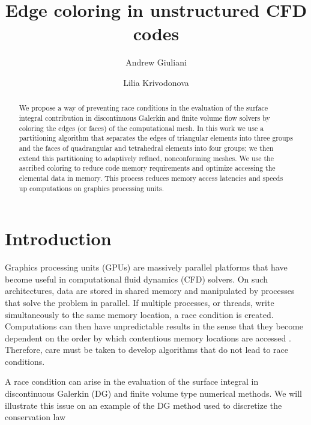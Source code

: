 \documentclass[12pt]{article}
\title{Edge coloring in unstructured CFD codes}
\author{Andrew Giuliani \and Lilia Krivodonova}
\begin{document}
	\date{\vspace{-5ex}}
	\maketitle


\begin{abstract}
	We propose a way of preventing race conditions in the evaluation of the surface integral contribution in discontinuous Galerkin and finite volume flow solvers by coloring the edges (or faces) of the computational mesh.  In this work we use a partitioning algorithm that separates the edges of triangular elements into three groups and the faces of quadrangular and tetrahedral elements into four groups; we then extend this partitioning to adaptively refined, nonconforming meshes.  We use the ascribed coloring to reduce code memory requirements and optimize accessing the elemental data in memory.  This process reduces memory access latencies and speeds up computations on graphics processing units.
\end{abstract}


\maketitle


\vspace{-6pt}

\section{Introduction} \label{sec:intro}

Graphics processing units (GPUs) are massively parallel platforms that have become useful in computational fluid dynamics (CFD) solvers.  On such architectures, data are stored in shared memory and manipulated by processes that solve the problem in parallel.  If multiple processes, or threads, write simultaneously to the same memory location, a race condition is created.  Computations can then have unpredictable results in the sense that they become dependent on the order by which contentious memory locations are accessed \cite{nvidiablog}.  Therefore, care must be taken to develop algorithms that do not lead to race conditions.




A race condition can arise in the evaluation of the surface integral in discontinuous Galerkin (DG) and finite volume type numerical methods.  We will illustrate this issue on an example of the DG method used to discretize the conservation law
\end{document}
